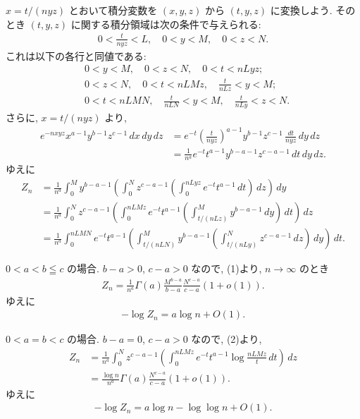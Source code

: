 \documentclass[12pt,twoside]{jarticle}
\theoremstyle{jplain}
\theoremstyle{jplain}
\theoremstyle{jplain}
\numberwithin{theorem}{section}
\numberwithin{equation}{section}
\numberwithin{figure}{section}
\numberwithin{table}{section}
\begin{document}
$x=t/(nyz)$ とおいて積分変数を $(x,y,z)$ から $(t,y,z)$ に変換しよう.
そのとき $(t,y,z)$ に関する積分領域は次の条件で与えられる:
\begin{align*}
0<\frac{t}{nyz}<L, \quad 0<y<M, \quad 0<z<N.
\end{align*} 
これは以下の各行と同値である:
\begin{align*}
&
0<y<M, \quad 0<z<N, \quad 0<t<nLyz;
\\ &
0<z<N, \quad 0<t<nLMz, \quad \frac{t}{nLz}<y<M;
\\ &
0<t<nLMN, \quad \frac{t}{nLN}<y<M, \quad \frac{t}{nLy}<z<N.
\end{align*}
さらに, $x=t/(nyz)$ より, 
\begin{align*}
e^{-nxyz} x^{a-1} y^{b-1} z^{c-1}\, dx\,dy\,dz
&
=e^{-t} \left(\frac{t}{nyz}\right)^{a-1} y^{b-1} z^{c-1}\,\frac{dt}{nyz}\,dy\,dz
\\ &
=\frac{1}{n^a} e^{-t} t^{a-1} y^{b-a-1} z^{c-a-1}\,dt\,dy\,dz.
\end{align*}
ゆえに
\begin{align*}
Z_n
&=
\frac{1}{n^a}
\int_0^M y^{b-a-1}
\left(\int_0^N z^{c-a-1}
\left(\int_0^{nLyz} e^{-t}t^{a-1}\,dt\right)\,dz\right)\,dy
\tag{1}
\\ &
=
\frac{1}{n^a}
\int_0^N z^{c-a-1}
\left(\int_0^{nLMz} e^{-t}t^{a-1}
\left(\int_{t/(nLz)}^M y^{b-a-1}\,dy\right)\,dt\right)\,dz
\tag{2}
\\ &
=
\frac{1}{n^a}
\int_0^{nLMN} e^{-t}t^{a-1}
\left(\int_{t/(nLN)}^M y^{b-a-1}
\left(\int_{t/(nLy)}^N z^{c-a-1}\,dz\right)\,dy\right)\,dt.
\tag{3}
\end{align*}

$0<a<b\leqq c$ の場合. 
$b-a>0$, $c-a>0$ なので, (1)より, $n\to\infty$ のとき
\begin{align*}
Z_n = \frac{1}{n^a}\Gamma(a)\frac{M^{b-a}}{b-a}\frac{N^{c-a}}{c-a}(1+o(1)).
\end{align*}
ゆえに
\begin{align*}
-\log Z_n = a\log n + O(1).
\end{align*}

$0<a=b<c$ の場合. $b-a=0$, $c-a>0$ なので, (2)より,
\begin{align*}
Z_n 
&=
\frac{1}{n^a}
\int_0^N z^{c-a-1}
\left(\int_0^{nLMz} e^{-t}t^{a-1}
\log\frac{nLMz}{t}
\,dt\right)\,dz
\\ &
=
\frac{\log n}{n^a}\Gamma(a)\frac{N^{c-a}}{c-a}(1+o(1)).
\end{align*}
ゆえに
\begin{align*}
-\log Z_n = a\log n - \log\log n + O(1).
\end{align*}
\end{document}
